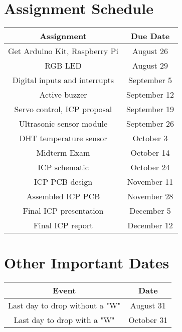 \section*{Assignment Schedule} 

\begin{table*}[h!]
    \begin{tabular}{ c | c }
        \toprule
        Assignment & Due Date \\

        \midrule
        Get Arduino Kit, Raspberry Pi\footnotemark  & August 26     \\
        RGB LED                                     & August 29     \\
        Digital inputs and interrupts               & September 5   \\
        Active buzzer                               & September 12  \\
        Servo control, ICP proposal\footnotemark[2] & September 19  \\
        Ultrasonic sensor module                    & September 26  \\
        DHT temperature sensor                      & October 3     \\
        Midterm Exam                                & October 14    \\
        ICP schematic                               & October 24    \\
        ICP PCB design                              & November 11   \\
        Assembled ICP PCB                           & November 28   \\
        Final ICP presentation                      & December 5    \\
        Final ICP report                            & December 12   \\

        \bottomrule
    \end{tabular}
\end{table*}

\section*{Other Important Dates}

\begin{table*}[h!]
    \begin{tabular}{ c | c }
        \toprule
        Event & Date \\

        \midrule
        Last day to drop without a "W"  & August 31 \\
        Last day to drop with a "W"     & October 31 \\

        \bottomrule
    \end{tabular}
\end{table*}

